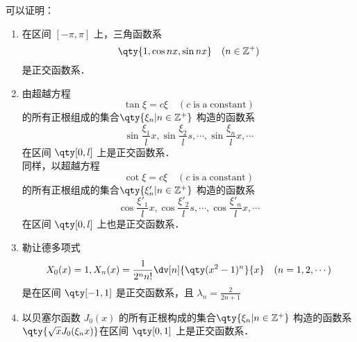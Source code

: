 可以证明：
\begin{enumerate}
\item 在区间 $[-\pi,\pi]$ 上，三角函数系
\begin{equation}
\qty{1,\cos nx,\sin nx}\quad(n\in \mathbb{Z^{+}})
\end{equation}
是正交函数系．
\item 由超越方程
\begin{equation}
\tan\xi=c\xi \quad(c\; \mathrm{is\; a\; constant})
\end{equation}
 的所有正根组成的集合$\qty{\xi_n\vert n\in\mathbb{Z}^+}$
 构造的函数系
 \begin{equation}
 \sin\frac{\xi_1}{l}x,\sin\frac{\xi_2}{l}s,\cdots,\sin\frac{\xi_n}{l}x,\cdots
 \end{equation}
 在区间 $\qty[0,l]$ 上是正交函数系．\\
 
 同样，以超越方程
\begin{equation}
\cot\xi=c\xi \quad(c\; \mathrm{is\; a\; constant})
\end{equation}
 的所有正根组成的集合$\qty{\xi'_n\vert n\in\mathbb{Z}^+}$
 构造的函数系
 \begin{equation}
 \cos\frac{\xi'_1}{l}x,\cos\frac{\xi'_2}{l}s,\cdots,\cos\frac{\xi'_n}{l}x,\cdots
 \end{equation}
 在区间 $\qty[0,l]$ 上也是正交函数系．
 \item 勒让德多项式
\begin{equation}
X_0(x)=1,X_n(x)=\frac{1}{2^nn!}\dv[n]{\qty(x^2-1)^n}{x}\quad(n=1,2,\cdots)
\end{equation}
是在区间 $\qty[-1,1]$ 是正交函数系，且 $\lambda_n=\frac{2}{2n+1}$
\item 以贝塞尔函数 $J_0(x)$ 的所有正根构成的集合$\qty{\xi_n\vert n\in\mathbb{Z}^+}$
构造的函数系$\qty{\sqrt{x}J_0(\xi_n x)} $在区间 $\qty[0,1]$ 上是正交函数系．
\end{enumerate}




